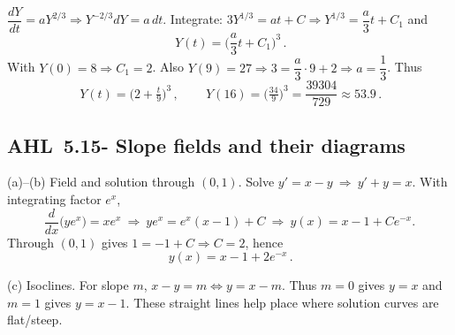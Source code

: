 \documentclass[11pt]{article}
\def\textbf#1{#1}%
\newcommand{\tocsubsection}[1]{\subsection{#1}}
\begin{document}
\begin{solution}
$\dfrac{dY}{dt}=aY^{2/3}\Rightarrow Y^{-2/3}dY=a\,dt$.
Integrate: $3Y^{1/3}=at+C\Rightarrow Y^{1/3}=\dfrac{a}{3}t+C_1$ and
\[
\boxed{\,Y(t)=\Big(\dfrac{a}{3}t+C_1\Big)^{3}\,}.
\]
With $Y(0)=8\Rightarrow C_1=2$.  Also $Y(9)=27\Rightarrow
3=\dfrac{a}{3}\cdot 9+2\Rightarrow a=\dfrac{1}{3}$.
Thus
\[
\boxed{\,Y(t)=\Big(2+\tfrac{t}{9}\Big)^{3}\,},\qquad
\boxed{\,Y(16)=\Big(\tfrac{34}{9}\Big)^{3}=\frac{39304}{729}\approx 53.9\,}.
\]
\end{solution}





\tocsubsection{AHL 5.15- Slope fields and their diagrams}


\begin{solution}
\textbf{(a)–(b) Field and solution through $(0,1)$.}
Solve $y'=x-y\ \Rightarrow\ y'+y=x$.
With integrating factor $e^{x}$,
\[
\frac{d}{dx}\!\big(y e^{x}\big)=x e^{x}\ \Rightarrow\ 
y e^{x}=e^{x}(x-1)+C \ \Rightarrow\ 
y(x)=x-1+Ce^{-x}.
\]
Through $(0,1)$ gives $1=-1+C\Rightarrow C=2$, hence
\[
\boxed{\,y(x)=x-1+2e^{-x}\,}.
\]

\textbf{(c) Isoclines.}
For slope $m$, $x-y=m\iff y=x-m$. Thus
$m=0$ gives $y=x$ and $m=1$ gives $y=x-1$. These straight lines help place
where solution curves are flat/steep.

\begin{center}
\end{center}
\end{solution}
\end{document}
